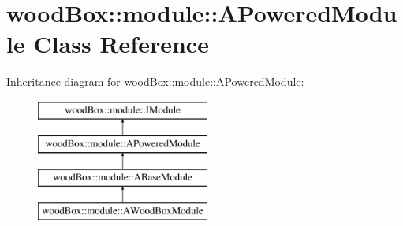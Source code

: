 \hypertarget{classwood_box_1_1module_1_1_a_powered_module}{}\section{wood\+Box\+:\+:module\+:\+:A\+Powered\+Module Class Reference}
\label{classwood_box_1_1module_1_1_a_powered_module}
Inheritance diagram for wood\+Box\+:\+:module\+:\+:A\+Powered\+Module\+:\begin{figure}[H]
\begin{center}
\leavevmode
\includegraphics[height=4.000000cm]{classwood_box_1_1module_1_1_a_powered_module}
\end{center}
\end{figure}
